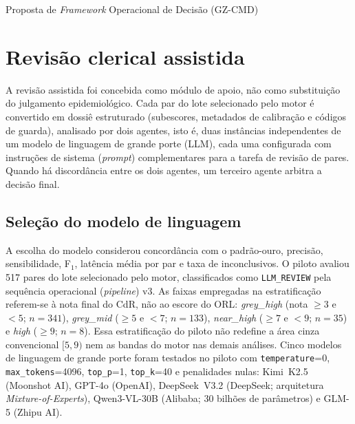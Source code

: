 \begin{chapter}{Proposta de \textit{Framework} Operacional de Decisão (GZ-CMD)}
\section{Revisão clerical assistida}
\label{sec:cap8-revisao-assistida}

A revisão assistida foi concebida como módulo de apoio, não como substituição do julgamento epidemiológico. Cada par do lote selecionado pelo motor é convertido em dossiê estruturado (subescores, metadados de calibração e códigos de guarda), analisado por dois agentes, isto é, duas instâncias independentes de um modelo de linguagem de grande porte (LLM), cada uma configurada com instruções de sistema (\textit{prompt}) complementares para a tarefa de revisão de pares. Quando há discordância entre os dois agentes, um terceiro agente arbitra a decisão final.

\subsection{Seleção do modelo de linguagem}
\label{sec:cap8-selecao-llm}

A escolha do modelo considerou concordância com o padrão-ouro, precisão, sensibilidade, F$_1$, latência média por par e taxa de inconclusivos. O piloto avaliou 517 pares do lote selecionado pelo motor, classificados como \texttt{LLM\_REVIEW} pela sequência operacional (\textit{pipeline}) v3. As faixas empregadas na estratificação referem-se à nota final do CdR, não ao escore do ORL: \textit{grey\_high} (nota $\geq 3$ e $< 5$; $n=341$), \textit{grey\_mid} ($\geq 5$ e $< 7$; $n=133$), \textit{near\_high} ($\geq 7$ e $< 9$; $n=35$) e \textit{high} ($\geq 9$; $n=8$). Essa estratificação do piloto não redefine a área cinza convencional $[5,9)$ nem as bandas do motor nas demais análises. Cinco modelos de linguagem de grande porte foram testados no piloto com \texttt{temperature}=0, \texttt{max\_tokens}=4096, \texttt{top\_p}=1, \texttt{top\_k}=40 e penalidades nulas: Kimi~K2.5 (Moonshot AI), GPT-4o (OpenAI), DeepSeek~V3.2 (DeepSeek; arquitetura \textit{Mixture-of-Experts}), Qwen3-VL-30B (Alibaba; 30 bilhões de parâmetros) e GLM-5 (Zhipu AI).


\end{chapter}
